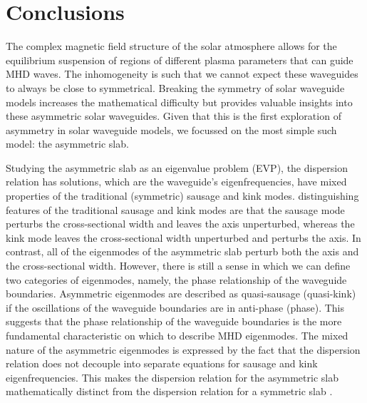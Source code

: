 \documentclass[12pt]{../style-files/ociamthesis}
\begin{document}
\baselineskip=18pt

\setcounter{secnumdepth}{3}
\setcounter{tocdepth}{3}

\setcounter{chapter}{5}


\chapter{Conclusions}
\label{chap: conclusion}

The complex magnetic field structure of the solar atmosphere allows for the equilibrium suspension of regions of different plasma parameters that can guide MHD waves. The inhomogeneity is such that we cannot expect these waveguides to always be close to symmetrical. Breaking the symmetry of solar waveguide models increases the mathematical difficulty but provides valuable insights into these asymmetric solar waveguides. Given that this is the first exploration of asymmetry in solar waveguide models, we focussed on the most simple such model: the asymmetric slab.

Studying the asymmetric slab as an eigenvalue problem (EVP), the dispersion relation has solutions, which are the waveguide's eigenfrequencies, have mixed properties of the traditional (symmetric) sausage and kink modes. distinguishing features of the traditional sausage and kink modes are that the sausage mode perturbs the cross-sectional width and leaves the axis unperturbed, whereas the kink mode leaves the cross-sectional width unperturbed and perturbs the axis. In contrast, all of the eigenmodes of the asymmetric slab perturb both the axis and the cross-sectional width. However, there is still a sense in which we can define two categories of eigenmodes, namely, the phase relationship of the waveguide boundaries. Asymmetric eigenmodes are described as quasi-sausage (quasi-kink) if the oscillations of the waveguide boundaries are in anti-phase (phase). This suggests that the phase relationship of the waveguide boundaries is the more fundamental characteristic on which to describe MHD eigenmodes.  The mixed nature of the asymmetric eigenmodes is expressed by the fact that the dispersion relation does not decouple into separate equations for sausage and kink eigenfrequencies. This makes the dispersion relation for the asymmetric slab mathematically distinct from the dispersion relation for a symmetric slab \citep{rob81b,edw_etal82}.
\end{document}
